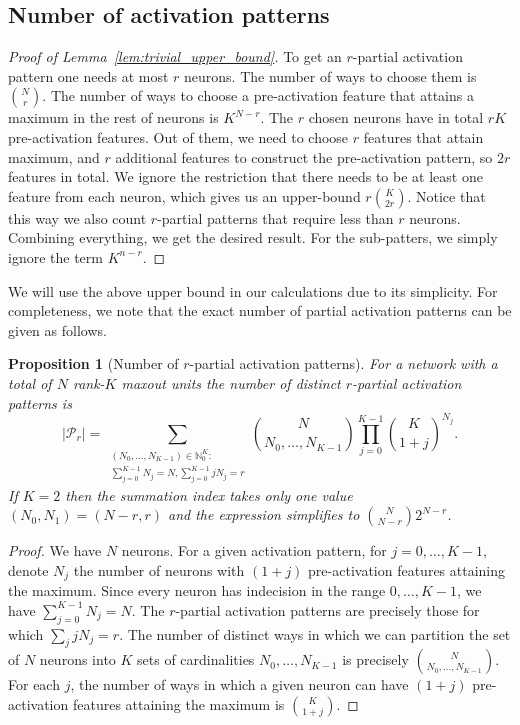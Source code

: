 \documentclass{article}
\newtheorem{proposition}[theorem]{Proposition}
\theoremstyle{definition}
\begin{document}
\subsection{Number of activation patterns}

\trivialupperboundlemma*
\begin{proof}[Proof of Lemma~\ref{lem:trivial_upper_bound}]
    To get an $r$-partial activation pattern one needs at most $r$ neurons. The number of ways to choose them is $\binom{N}{r}$. The number of ways to choose a pre-activation feature that attains a maximum in the rest of neurons is $K^{N - r}$. The $r$ chosen neurons have in total $r K$ pre-activation features. Out of them, we need to choose $r$ features that attain maximum, and $r$ additional features to construct the pre-activation pattern, so $2r$ features in total. 
    We ignore the restriction that there needs to be at least one feature from each neuron, which gives us an upper-bound ${r \binom{K}{2r}}$. 
    Notice that this way we also count $r$-partial patterns that require less than $r$ neurons. Combining everything, we get the desired result. 
    For the sub-patters, we simply ignore the term $K^{n-r}$. 
\end{proof}

We will use the above upper bound in our calculations due to its simplicity. 
For completeness, we note that the exact number of partial activation patterns can be given as follows. 

\begin{proposition}[Number of $r$-partial activation patterns]
\label{proposition:maxnrpartialactivation}
For a network with a total of $N$ rank-$K$ maxout units the number of distinct $r$-partial activation patterns is 
$$
|\mathcal{P}_r| = \sum_{\substack{(N_0,\ldots, N_{K-1})\in\mathbb{N}_0^K\colon \\  \sum_{j=0}^{K-1} N_j = N, \sum_{j=0}^{K-1} j N_j = r}} \binom{N}{ N_0,\ldots, N_{K-1}} \prod_{j=0}^{K-1} \binom{K}{1+j}^{N_j}. 
$$
If $K=2$ then the summation index takes only one value $(N_0,N_1)=(N-r,r)$ and the expression simplifies to $ \binom{N}{N-r} 2^{N-r}$. 
\end{proposition}
\begin{proof}
We have $N$ neurons. For a given activation pattern, for $j=0,\ldots, K-1$, denote $N_j$ the number of neurons with $(1+j)$ pre-activation features attaining the maximum.
Since every neuron has indecision in the range $0,\ldots, K-1$, we have $\sum_{j=0}^{K-1} N_j=N$. 
The $r$-partial activation patterns are precisely those for which $\sum_j j N_j=r$. 
The number of distinct ways in which we can partition the set of $N$ neurons into $K$ sets of cardinalities $N_0,\ldots, N_{K-1}$ is precisely $\binom{N}{N_0,\ldots, N_{K-1}}$. 
For each $j$, the number of ways in which a given neuron can have $(1+j)$ pre-activation features attaining the maximum is $\binom{K}{1+j}$. 
\end{proof}
\end{document}
